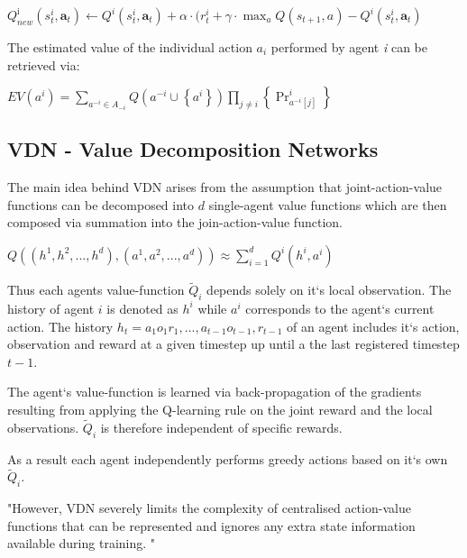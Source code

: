 \begin{center}
	
	$Q^{\text {i}}_{new}\left(s^{i}_{t}, \mathbf{a}_{t}\right) 
	\leftarrow 
	Q^{i}\left(s^{i}_{t}, \mathbf{a}_{t}\right)
	+
	\alpha
	\cdot
	(r^{i}_{t}+\gamma\cdot\max _{a} Q\left(s_{t+1}, a\right)
	-
	Q^{i}\left(s^{i}_{t}, \mathbf{a}_{t}\right)
	$
	
\end{center}

The estimated value of the individual action $a_{i}$ performed by agent \textit{i} can be retrieved via:

\begin{center}
	$E V\left(a^{i}\right)=\sum_{a^{-i} \in A_{-i}} Q\left(a^{-i} \cup\left\{a^{i}\right\}\right) \prod_{j \neq i}\left\{\operatorname{Pr}_{a^{-i}[j]}^{i}\right\}$
\end{center}
\cite{claus1998dynamics}

\subsection{VDN - Value Decomposition Networks}
The main idea behind VDN arises from the assumption that joint-action-value functions can be decomposed into $ \mathit{d} $ single-agent value functions which are then composed via summation into the join-action-value function.
\begin{center}
	$ Q((h^1, h^2, ..., h^d),(a^1, a^2, ..., a^d)) \approx \sum_{i=1}^{d} Q^i(h^i, a^i) $
\end{center}

Thus each agents value-function $ \tilde{Q}_i $ depends solely on it`s local observation. The history of agent $\mathit{i}$ is denoted as $h^i$ while $a^i$ corresponds to the agent`s current action. The history $h_t = a_1o_1r_1,...,a_{t-1}o_{t-1},r_{t-1}$ of an agent includes it`s action, observation and reward at a given timestep up until a the last registered timestep ${t-1}$. 

The agent`s value-function is learned via back-propagation of the gradients resulting from applying the Q-learning rule on the joint reward and the local observations. $ \tilde{Q}_i $ is therefore independent of specific rewards.

As a result each agent independently performs greedy actions based on it`s own $ \tilde{Q}_i $. \cite{sunehag2017value}

"However, VDN severely limits the complexity of centralised action-value
functions that can be represented and ignores any extra state information available during training. \cite{rashid2018qmix}"

